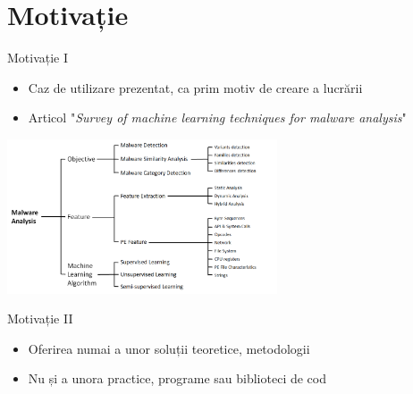 \section{Motivație}

\begin{frame}{Motivație I} \pause
	\begin{itemize}
		\item Caz de utilizare prezentat, ca prim motiv de creare a lucrării \pause
		\item Articol "\textit{Survey of machine learning techniques for malware analysis}"
	\end{itemize}
	
	\vspace*{0.5cm}
	\includegraphics[width=0.6\textwidth, center]{components/images/SotA.png}
	\label{fig:sota}
    \captionsetup{justification=centering,margin=1cm}
\end{frame}

\begin{frame}{Motivație II} \pause
	\begin{itemize}
		\item Oferirea numai a unor soluții teoretice, metodologii \pause
		\item Nu și a unora practice, programe sau biblioteci de cod
	\end{itemize}
\end{frame}
